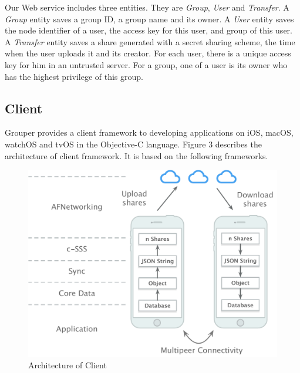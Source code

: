 \documentclass[twocolumn,10pt]{article}
\begin{document}
Our Web service includes three entities. They are \emph{Group}, \emph{User} and \emph{Transfer}. A \emph{Group} entity saves a group ID, a group name and its owner. A \emph{User} entity saves the node identifier of a user, the access key for this user, and group of this user. A \emph{Transfer} entity saves a share generated with a secret sharing scheme, the time when the user uploads it and its creator. For each user, there is a unique access key for him in an untrusted server. For a group, one of a user is its owner who has the highest privilege of this group.

\subsection{Client}

Grouper provides a client framework to developing applications on iOS, macOS, watchOS and tvOS in the Objective-C language. Figure 3 describes the architecture of client framework. It is based on the following frameworks.   

\begin{figure}[t]
	\centering
	\includegraphics[scale=0.35]{architecture}
	\caption{Architecture of Client}
\end{figure}
\end{document}
